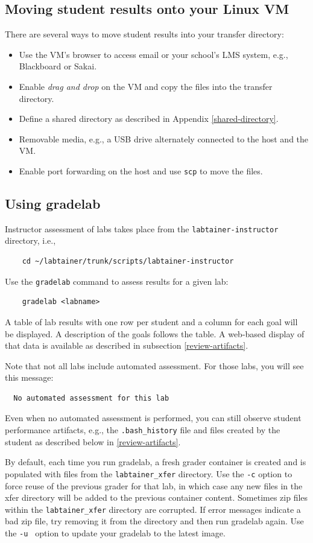\documentclass[12pt]{article}
\begin{document}
\subsection{Moving student results onto your Linux VM}
There are several ways to move student results into your transfer directory:
\begin{itemize}
\item Use the VM's browser to access email or your school's LMS system, e.g., Blackboard or Sakai.
\item Enable \textit{drag and drop} on the VM and copy the files into the transfer directory.
\item Define a shared directory as described in Appendix \ref{shared-directory}.
\item Removable media, e.g., a USB drive alternately connected to the host and the VM.
\item Enable port forwarding on the host and use {\tt scp} to move the files.
\end{itemize}

\subsection{Using gradelab}
Instructor assessment of labs takes place from the {\tt labtainer-instructor} directory, i.e.,
\begin{verbatim}
    cd ~/labtainer/trunk/scripts/labtainer-instructor
\end{verbatim}

\noindent Use the {\tt gradelab} command to assess results for a given lab:
\begin{verbatim}
    gradelab <labname>
\end{verbatim}
\noindent A table of lab results with one row per student and
a column for each goal will be displayed.  A description of the goals follows the table.
A web-based display of that data is available as described in subsection \ref{review-artifacts}.

Note that not all labs include automated assessment.  For those labs, you will see this
message:
\begin{verbatim}
  No automated assessment for this lab
\end{verbatim}
\noindent Even when no automated assessment is performed, you can still observe student performance
artifacts, e.g., the {\tt .bash\_history} file and files created by the student as described below in \ref{review-artifacts}.

By default, each time you run gradelab, a fresh grader container is created and is populated with files from the 
{\tt labtainer\_xfer} directory.   Use the {\tt -c} option to force reuse of the previous grader for that lab, in which case
any new files in the xfer directory will be added to the previous container content.
Sometimes zip files within the {\tt labtainer\_xfer} directory are corrupted.  If error messages indicate a bad zip file,
try removing it from the directory and then run gradelab again.
Use the {\tt -u } option to update your gradelab to the latest image.
\end{document}
